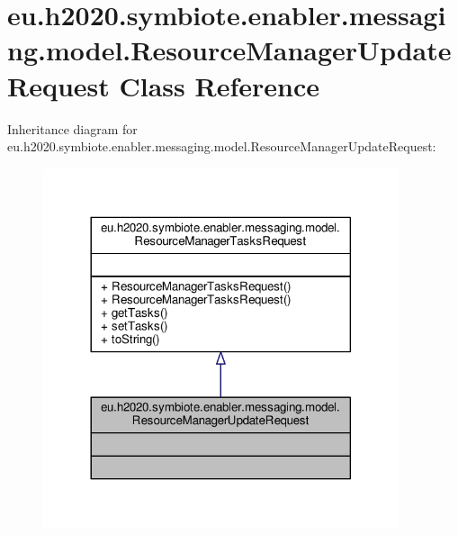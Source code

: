 \hypertarget{classeu_1_1h2020_1_1symbiote_1_1enabler_1_1messaging_1_1model_1_1ResourceManagerUpdateRequest}{}\section{eu.\+h2020.\+symbiote.\+enabler.\+messaging.\+model.\+Resource\+Manager\+Update\+Request Class Reference}
\label{classeu_1_1h2020_1_1symbiote_1_1enabler_1_1messaging_1_1model_1_1ResourceManagerUpdateRequest}


Inheritance diagram for eu.\+h2020.\+symbiote.\+enabler.\+messaging.\+model.\+Resource\+Manager\+Update\+Request\+:\nopagebreak
\begin{figure}[H]
\begin{center}
\leavevmode
\includegraphics[width=296pt]{classeu_1_1h2020_1_1symbiote_1_1enabler_1_1messaging_1_1model_1_1ResourceManagerUpdateRequest__inherit__graph}
\end{center}
\end{figure}



